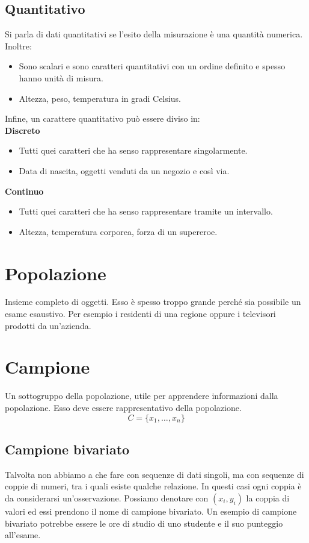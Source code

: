 \documentclass[11pt]{report}
\begin{document}
\subsection{Quantitativo}
Si parla di dati quantitativi se l'esito della misurazione è una quantità numerica. Inoltre:
\begin{itemize}
    \item Sono scalari e sono caratteri quantitativi con un ordine definito e spesso hanno unità di misura.
    \item Altezza, peso, temperatura in gradi Celsius.
\end{itemize}
Infine, un carattere quantitativo può essere diviso in:\\
\textbf{Discreto}
\begin{itemize}
    \item Tutti quei caratteri che ha senso rappresentare singolarmente.
    \item Data di nascita, oggetti venduti da un negozio e così via.
\end{itemize}
\textbf{Continuo}
\begin{itemize}
    \item Tutti quei caratteri che ha senso rappresentare tramite un intervallo.
    \item Altezza, temperatura corporea, forza di un supereroe.
\end{itemize}

\section{Popolazione}
Insieme completo di oggetti. Esso è spesso troppo grande perché sia possibile un esame esaustivo. Per esempio i residenti di una regione oppure i televisori prodotti da un'azienda.

\section{Campione}
Un sottogruppo della popolazione, utile per apprendere informazioni dalla popolazione. Esso deve essere rappresentativo della popolazione.
\begin{equation}
    C=\{x_1, \dots, x_n\}
\end{equation}
\subsection{Campione bivariato}
Talvolta non abbiamo a che fare con sequenze di dati singoli, ma con sequenze di coppie di numeri, tra i quali esiste qualche relazione. In questi casi ogni coppia è da considerarsi un'osservazione. Possiamo denotare con $(x_i, y_i)$ la coppia di valori ed essi prendono il nome di campione bivariato. Un esempio di campione bivariato potrebbe essere le ore di studio di uno studente e il suo punteggio all'esame.
\end{document}
